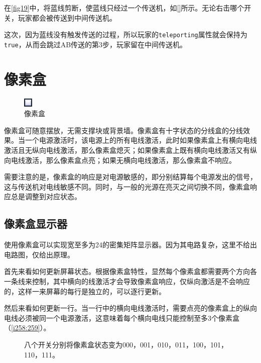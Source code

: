 \begin{example}
在\autoref{fig19}中，将蓝线剪断，使蓝线只经过一个传送机，如\autoref{}所示。无论右击哪个开关，玩家都会被传送到中间传送机。

这次，因为蓝线没有触发传送的过程，所以玩家的\lstinline{teleporting}属性就会保持为\lstinline{true}，从而会跳过AB传送的第3步，玩家留在中间传送机。
\end{example}

\section{像素盒}
\begin{figure}[!ht]
\centering
\includegraphics{figures/Pixel_Box.png}
\caption{像素盒}
\end{figure}
像素盒可随意摆放，无需支撑块或背景墙。像素盒有十字状态的分线盒的分线效果。当一个电源激活时，该电源上的所有电线激活，此时如果像素盒上有横向电线激活且无纵向电线激活，那么像素盒熄灭；如果像素盒上既有横向电线激活又有纵向电线激活，那么像素盒点亮；如果无横向电线激活，那么像素盒不响应。

需要注意的是，像素盒的响应是对电源敏感的，即分别结算每个电源发出的信号，这与传送机对电线敏感不同。同时，与一般的光源在亮灭之间切换不同，像素盒响应总是调整到对应状态。

\subsection{像素盒显示器}\label{sec21}

使用像素盒可以实现宽至多为24的密集矩阵显示器。因为其电路复杂，这里不给出电路图，仅给出原理。

首先来看如何更新屏幕状态。根据像素盒特性，显然每个像素盒都需要两个方向各一条线来控制，其中横向的线激活才会导致像素盒响应，仅纵向激活是不会响应的，这样一来屏幕的每行是独立的，可以逐行更新。

然后来看如何更新一行。当一行中的横向电线激活时，需要点亮的像素盒上的纵向电线必须被同一个电源激活，这意味着每个横向电线只能控制至多3个像素盒（\autoref{i258:259}）。

\begin{figure}[!ht]
\begin{center}
\qquad
{}
\end{center}
\caption{八个开关分别将像素盒状态变为000，001，010，011，100，101，110，111。}
\label{i258:259}
\end{figure}

